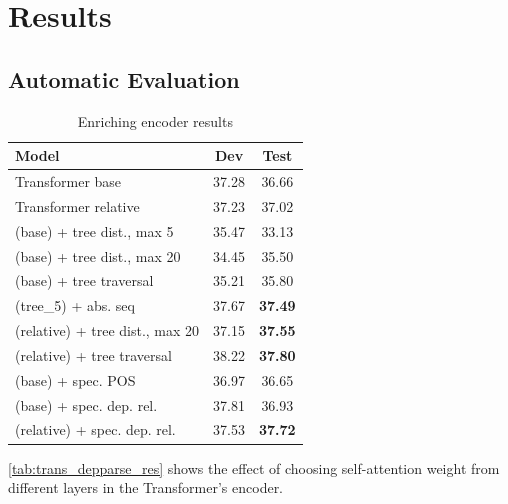 \chapter{Results}

\section{Automatic Evaluation}

\begin{table}
\begin{center}
\small
\begin{tabular}{lcc}
\textbf{Model}        	& \textbf{Dev}	& \textbf{Test}	\\
\hline
Transformer base    					& 37.28 & 36.66 \\
Transformer relative					& 37.23 & 37.02 \\
\hline
(base) + tree dist., max 5				& 35.47 & 33.13 \\
(base) + tree dist., max 20				& 34.45 & 35.50 \\
(base) + tree traversal					& 35.21 & 35.80 \\
(tree\_5) + abs. seq					& 37.67 & \textbf{37.49} \\
(relative) + tree dist., max 20			& 37.15 & \textbf{37.55} \\
(relative) + tree traversal				& 38.22 & \textbf{37.80} \\
\hline
(base) + spec. POS						& 36.97 & 36.65 \\
(base) + spec. dep. rel.				& 37.81 & 36.93\\
(relative) + spec. dep. rel.			& 37.53 &  \textbf{37.72} \\
\end{tabular}
\end{center}
\caption{Enriching encoder results}
\end{table}


\cref{tab:trans_depparse_res} shows the effect of choosing self-attention weight from different layers in the Transformer's encoder.

